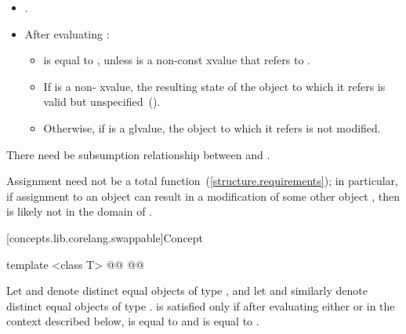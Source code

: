 \begin{addedblock}
\begin{itemdescr}
\begin{itemize}
\item {}.

\item After evaluating :

\begin{itemize}
\item {} is equal to , unless  is a non-const
xvalue that refers to .

\item If  is a non- xvalue, the resulting state of the
object to which it refers is valid but unspecified~().

\item Otherwise, if  is a glvalue, the object to which it refers is not
modified.
\end{itemize}
\end{itemize}

\pnum
There need  be   subsumption relationship between 
and .

\pnum
\enternote Assignment need not be a total function~(\ref{structure.requirements});
in particular, if assignment to an object  can result in a modification
of some other object , then  is likely not in the domain
of \tcode{=}. \exitnote
\end{itemdescr}

[concepts.lib.corelang.swappable]{Concept }

%
\begin{itemdecl}
template <class T>
@@
@@
\end{itemdecl}

{\color{newclr}
\begin{itemdescr}
\pnum
Let  and  denote distinct equal objects of type ,
and let  and  similarly denote distinct equal objects of type
.  is satisfied only if after evaluating either
 or  in the context described below,
 is equal to  and  is equal to .


\end{itemdescr}}
\end{addedblock}
